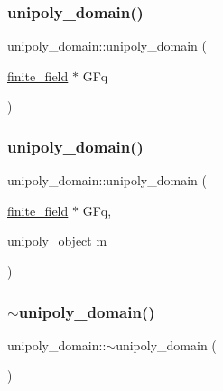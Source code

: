\subsubsection{\texorpdfstring{unipoly\+\_\+domain()}{unipoly\_domain()}\hspace{0.1cm}{\footnotesize\ttfamily [1/2]}}
{\footnotesize\ttfamily unipoly\+\_\+domain\+::unipoly\+\_\+domain (\begin{DoxyParamCaption}\item[{\mbox{\hyperlink{classfinite__field}{finite\+\_\+field}} $\ast$}]{G\+Fq }\end{DoxyParamCaption})}

\mbox{\label{classunipoly__domain_a4f985c5bd69071f5116acf266733efb4}} 
\subsubsection{\texorpdfstring{unipoly\+\_\+domain()}{unipoly\_domain()}\hspace{0.1cm}{\footnotesize\ttfamily [2/2]}}
{\footnotesize\ttfamily unipoly\+\_\+domain\+::unipoly\+\_\+domain (\begin{DoxyParamCaption}\item[{\mbox{\hyperlink{classfinite__field}{finite\+\_\+field}} $\ast$}]{G\+Fq,  }\item[{\mbox{\hyperlink{galois_8h_a77ca58de3d2da6172242493dd9c8aaa8}{unipoly\+\_\+object}}}]{m }\end{DoxyParamCaption})}

\mbox{\label{classunipoly__domain_a37c0a454e307c2fdb6e5309b8ecf3642}} 
\subsubsection{\texorpdfstring{$\sim$unipoly\+\_\+domain()}{~unipoly\_domain()}}
{\footnotesize\ttfamily unipoly\+\_\+domain\+::$\sim$unipoly\+\_\+domain (\begin{DoxyParamCaption}{ }\end{DoxyParamCaption})}



